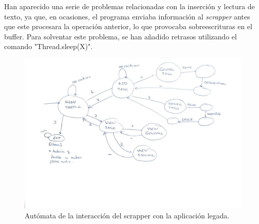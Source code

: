 \documentclass[10pt,a4paper]{article}
\begin{document}
Han aparecido una serie de problemas relacionadas con la inserción y lectura de texto, ya que, en ocasiones, el programa enviaba información al \textit{scrapper} antes que este procesara la operación anterior, lo que provocaba sobreescrituras en el buffer. Para solventar este problema, se han añadido retrasos utilizando el comando "Thread.sleep(X)".\\


\begin{figure}[h!]
\centering
\includegraphics[scale=0.5]{images/automata.jpg}
\caption{Autómata de la interacción del scrapper con la aplicación legada.}
\label{fig:automata}
\end{figure}
\end{document}
